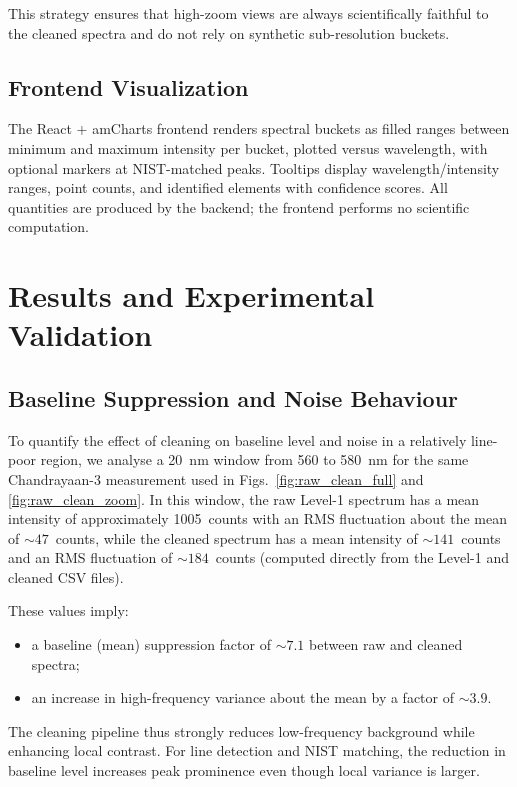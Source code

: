 \documentclass[12pt,a4paper]{article}
\begin{document}
This strategy ensures that high-zoom views are always scientifically faithful to the cleaned spectra and do not rely on synthetic sub-resolution buckets.

\subsection{Frontend Visualization}

The React + amCharts frontend renders spectral buckets as filled ranges between minimum and maximum intensity per bucket, plotted versus wavelength, with optional markers at NIST-matched peaks. Tooltips display wavelength/intensity ranges, point counts, and identified elements with confidence scores. All quantities are produced by the backend; the frontend performs no scientific computation.

\section{Results and Experimental Validation}
\label{sec:results}

\subsection{Baseline Suppression and Noise Behaviour}

To quantify the effect of cleaning on baseline level and noise in a relatively line-poor region, we analyse a 20~nm window from 560 to 580~nm for the same Chandrayaan-3 measurement used in Figs.~\ref{fig:raw_clean_full} and \ref{fig:raw_clean_zoom}. In this window, the raw Level-1 spectrum has a mean intensity of approximately 1005~counts with an RMS fluctuation about the mean of \(\sim 47\)~counts, while the cleaned spectrum has a mean intensity of \(\sim 141\)~counts and an RMS fluctuation of \(\sim 184\)~counts (computed directly from the Level-1 and cleaned CSV files).

These values imply:

\begin{itemize}[nosep]
  \item a baseline (mean) suppression factor of \(\sim 7.1\) between raw and cleaned spectra;
  \item an increase in high-frequency variance about the mean by a factor of \(\sim 3.9\).
\end{itemize}

The cleaning pipeline thus strongly reduces low-frequency background while enhancing local contrast. For line detection and NIST matching, the reduction in baseline level increases peak prominence even though local variance is larger.
\end{document}
